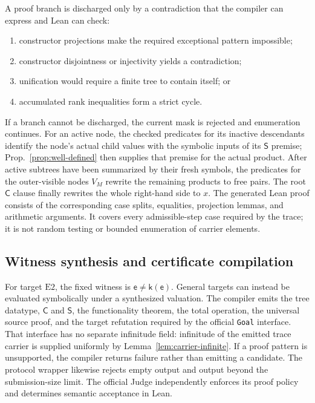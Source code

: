 \documentclass[runningheads]{llncs}
\newcommand{\Law}[1]{\ensuremath{\mathrm{E}#1}}
\newcommand{\Code}{\mathsf{C}}
\newcommand{\Step}{\mathsf{S}}
\begin{document}
A proof branch is discharged only by a contradiction that the compiler can
express and Lean can check:
\begin{enumerate}
  \item constructor projections make the required exceptional pattern
    impossible;
  \item constructor disjointness or injectivity yields a contradiction;
  \item unification would require a finite tree to contain itself; or
  \item accumulated rank inequalities form a strict cycle.
\end{enumerate}
If a branch cannot be discharged, the current mask is rejected and enumeration
continues.  For an active node, the checked predicates for its inactive
descendants identify the node's actual child values with the symbolic inputs
of its $\Step$ premise; Prop.~\ref{prop:well-defined} then supplies that
premise for the actual product.  After active subtrees have been summarized by
their fresh symbols, the predicates for the outer-visible nodes $V_M$ rewrite
the remaining products to free pairs.  The root $\Code$ clause finally rewrites
the whole right-hand side to $x$.  The generated Lean proof consists of the
corresponding case splits, equalities, projection lemmas, and arithmetic
arguments.  It covers every admissible-step case required by the trace; it is
not random testing or bounded enumeration of carrier elements.

\subsection{Witness synthesis and certificate compilation}

For target \Law{2}, the fixed witness is
$\mathsf e\ne\mathsf k(\mathsf e)$.  General targets can instead be evaluated
symbolically under a synthesized valuation.  The compiler emits the tree
datatype, $\Code$ and $\Step$, the functionality theorem, the total operation,
the universal source proof, and the target refutation required by the official
\texttt{Goal} interface.  That interface has no separate infinitude field:
infinitude of the emitted trace carrier is supplied uniformly by
Lemma~\ref{lem:carrier-infinite}.  If a proof pattern is unsupported, the
compiler returns failure rather than emitting a candidate.  The protocol
wrapper likewise rejects empty output and output beyond the submission-size
limit.  The official Judge independently enforces its proof policy and
determines semantic acceptance in Lean.
\end{document}
